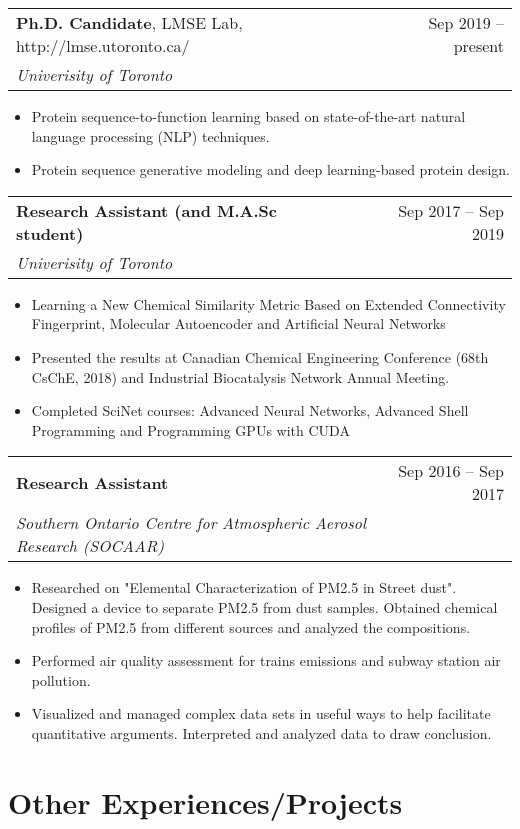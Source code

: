 \documentclass[a4paper,20pt]{article}
\makeatletter
\newcommand{\resumeItem}[2]{
  \item\small{
    #1 {#2 \vspace{-2pt}}
  }
}
\newcommand{\resumeSubheading}[4]{
  \vspace{-1pt}
    \begin{tabular*}{0.97\textwidth}{l@{\extracolsep{\fill}}r}
      #1 & #2 \\
      \textit{#3} & #4 \\
    \end{tabular*}\vspace{0pt}
}
\newcommand{\resumeSubHeadingListStart}{}
\newcommand{\resumeSubHeadingListEnd}{}
\newcommand{\resumeItemListStart}{\begin{itemize}[itemsep=0pt]\vspace{-5pt}}
\newcommand{\resumeItemListEnd}{\end{itemize}\vspace{-5pt}}
\makeatother
\begin{document}
    \resumeSubheading{\textbf{Ph.D. Candidate}, LMSE Lab, http://lmse.utoronto.ca/ }{Sep 2019 – present}
    {Univerisity of Toronto}{}
    
    \resumeItemListStart
        \resumeItem{}
        {Protein sequence-to-function learning based on state-of-the-art natural language processing (NLP) techniques.}
        \resumeItem{}
        {Protein sequence generative modeling and deep learning-based protein design.}
    \resumeItemListEnd

      
\vspace{1pt}

    \resumeSubheading{\textbf{Research Assistant (and M.A.Sc student)} }{Sep 2017 – Sep 2019}
    {Univerisity of Toronto}{}
    
    \resumeItemListStart
        \resumeItem{}
        {Learning a New Chemical Similarity Metric Based on Extended Connectivity Fingerprint, Molecular Autoencoder and Artificial Neural Networks}
        \resumeItem{}
        {Presented the results at Canadian Chemical Engineering Conference (68th CsChE, 2018) and Industrial Biocatalysis Network Annual Meeting.}
        \resumeItem{}
        {Completed SciNet courses: Advanced Neural Networks, Advanced Shell Programming and Programming GPUs with CUDA}
    \resumeItemListEnd


\vspace{1pt}

    \resumeSubheading{\textbf{Research Assistant} }{Sep 2016 – Sep 2017}
    {Southern Ontario Centre for Atmospheric Aerosol Research (SOCAAR)}{}
    
    \resumeItemListStart
        \resumeItem{}
        {Researched on "Elemental Characterization of PM2.5 in Street dust". Designed a device to separate PM2.5 from dust samples. Obtained chemical profiles of PM2.5 from different sources and analyzed the compositions.}
        \resumeItem{}
        {Performed air quality assessment for trains emissions and subway station air pollution.}
        \resumeItem{}
        {Visualized and managed complex data sets in useful ways to help facilitate quantitative arguments. Interpreted and analyzed data to draw conclusion.}
    \resumeItemListEnd

\resumeSubHeadingListEnd

\vspace{1pt}
\section{Other Experiences/Projects}
\resumeSubHeadingListStart
\end{document}
